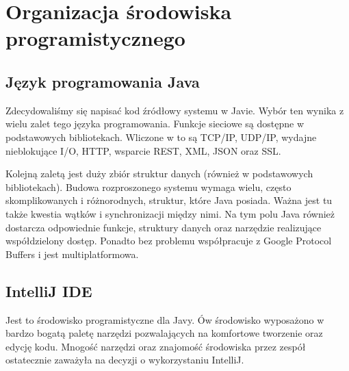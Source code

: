 \section[Organizacja środowiska programistycznego]{Organizacja środowiska programistycznego}

\subsection[Język programowania Java]{Język programowania Java}

\par{Zdecydowaliśmy się napisać kod źródłowy systemu w Javie. Wybór ten wynika z wielu zalet tego języka programowania. Funkcje sieciowe są dostępne w podstawowych bibliotekach. Wliczone w to są TCP/IP, UDP/IP, wydajne nieblokujące I/O, HTTP, wsparcie REST, XML, JSON oraz SSL.}

\par{Kolejną zaletą jest duży zbiór struktur danych (również w podstawowych bibliotekach). Budowa rozproszonego systemu wymaga wielu, często skomplikowanych i różnorodnych, struktur, które Java posiada. Ważna jest tu także kwestia wątków i synchronizacji między nimi. Na tym polu Java również dostarcza odpowiednie funkcje, struktury danych oraz narzędzie realizujące współdzielony dostęp. Ponadto bez problemu współpracuje z Google Protocol Buffers i jest multiplatformowa.}

\subsection[IntelliJ IDE]{IntelliJ IDE}

\par{Jest to środowisko programistyczne dla Javy. Ów środowisko wyposażono w bardzo bogatą paletę narzędzi pozwalających na komfortowe tworzenie oraz edycję kodu. Mnogość narzędzi oraz znajomość środowiska przez zespół ostatecznie zaważyła na decyzji o wykorzystaniu IntelliJ.}
